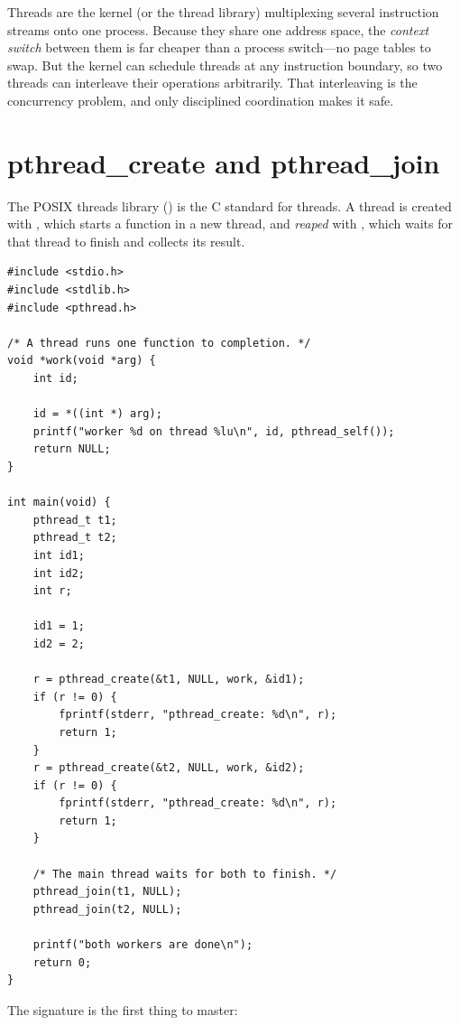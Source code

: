 \begin{osconcept}
Threads are the kernel (or the thread library) multiplexing several
instruction streams onto one process. Because they share one address
space, the \emph{context switch} between them is far cheaper than a
process switch---no page tables to swap. But the kernel can schedule
threads at any instruction boundary, so two threads can interleave
their operations arbitrarily. That interleaving is the concurrency
problem, and only disciplined coordination makes it safe.
\end{osconcept}

\section{pthread\_create and pthread\_join}

The POSIX threads library () is the C standard for
threads. A thread is created with , which starts
a function in a new thread, and \emph{reaped} with
, which waits for that thread to finish and
collects its result.

\begin{lstlisting}[caption={Creating two threads and waiting for them.}]
#include <stdio.h>
#include <stdlib.h>
#include <pthread.h>

/* A thread runs one function to completion. */
void *work(void *arg) {
    int id;

    id = *((int *) arg);
    printf("worker %d on thread %lu\n", id, pthread_self());
    return NULL;
}

int main(void) {
    pthread_t t1;
    pthread_t t2;
    int id1;
    int id2;
    int r;

    id1 = 1;
    id2 = 2;

    r = pthread_create(&t1, NULL, work, &id1);
    if (r != 0) {
        fprintf(stderr, "pthread_create: %d\n", r);
        return 1;
    }
    r = pthread_create(&t2, NULL, work, &id2);
    if (r != 0) {
        fprintf(stderr, "pthread_create: %d\n", r);
        return 1;
    }

    /* The main thread waits for both to finish. */
    pthread_join(t1, NULL);
    pthread_join(t2, NULL);

    printf("both workers are done\n");
    return 0;
}
\end{lstlisting}

The signature is the first thing to master:


